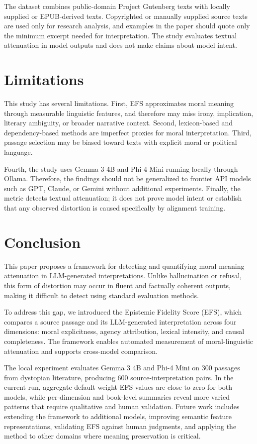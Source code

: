 \documentclass[10pt, conference]{IEEEtran}
\begin{document}
The dataset combines public-domain Project Gutenberg texts with locally supplied or EPUB-derived texts. Copyrighted or manually supplied source texts are used only for research analysis, and examples in the paper should quote only the minimum excerpt needed for interpretation. The study evaluates textual attenuation in model outputs and does not make claims about model intent.

\section{Limitations}

This study has several limitations. First, EFS approximates moral meaning through measurable linguistic features, and therefore may miss irony, implication, literary ambiguity, or broader narrative context. Second, lexicon-based and dependency-based methods are imperfect proxies for moral interpretation. Third, passage selection may be biased toward texts with explicit moral or political language.

Fourth, the study uses Gemma 3 4B and Phi-4 Mini running locally through Ollama. Therefore, the findings should not be generalized to frontier API models such as GPT, Claude, or Gemini without additional experiments. Finally, the metric detects textual attenuation; it does not prove model intent or establish that any observed distortion is caused specifically by alignment training.

\section{Conclusion}

This paper proposes a framework for detecting and quantifying moral meaning attenuation in LLM-generated interpretations. Unlike hallucination or refusal, this form of distortion may occur in fluent and factually coherent outputs, making it difficult to detect using standard evaluation methods.

To address this gap, we introduced the Epistemic Fidelity Score (EFS), which compares a source passage and its LLM-generated interpretation across four dimensions: moral explicitness, agency attribution, lexical intensity, and causal completeness. The framework enables automated measurement of moral-linguistic attenuation and supports cross-model comparison.

The local experiment evaluates Gemma 3 4B and Phi-4 Mini on 300 passages from dystopian literature, producing 600 source-interpretation pairs. In the current run, aggregate default-weight EFS values are close to zero for both models, while per-dimension and book-level summaries reveal more varied patterns that require qualitative and human validation. Future work includes extending the framework to additional models, improving semantic feature representations, validating EFS against human judgments, and applying the method to other domains where meaning preservation is critical.


\nocite{*}

\end{document}

